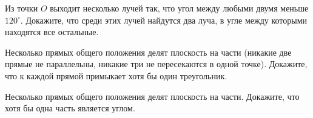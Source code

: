 \resetproblem \begingroup %
    \def\jeolmdate{16 ноября 2018 г.}%
    \def\jeolmauthors{Доледенок А.\,В., Орлов О.\,П.}%
\jeolmheader \endgroup


\begin{problems}


\item Из точки $O$ выходит несколько лучей так, что угол между любыми двумя меньше $120^{\circ}$. Докажите, что среди этих лучей найдутся два луча, в угле между которыми находятся все остальные.

\item Несколько прямых общего положения делят плоскость на части (никакие две прямые не параллельны, никакие три не пересекаются в одной точке). Докажите, что к каждой прямой примыкает хотя бы один треугольник.

\item Несколько прямых общего положения делят плоскость на части. Докажите, что хотя бы одна часть является углом.


\end{problems}

